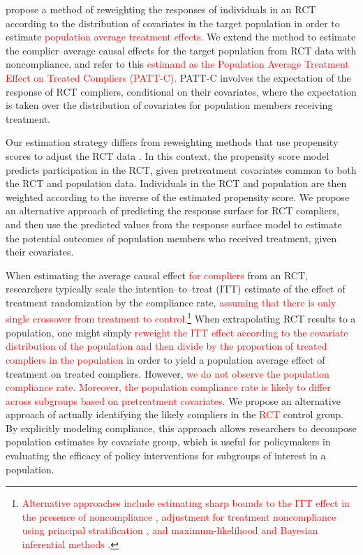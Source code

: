 \documentclass[hidelinks,12pt]{article}
\begin{document}
\citet{Hartman} propose a method of reweighting the responses of individuals in an RCT according to the distribution of covariates in the target population in order to estimate \textcolor{red}{population average treatment effects}. We extend the method to estimate the complier--average causal effects for the target population from RCT data with noncompliance, and refer to this \textcolor{red}{estimand as the Population Average Treatment Effect on Treated Compliers (PATT-C).} PATT-C involves the expectation of the response of RCT compliers, conditional on their covariates, where the expectation is taken over the distribution of covariates for population members receiving treatment. 

Our estimation strategy differs from reweighting methods that use propensity scores to adjust the RCT data \citep{stuart2011use}. In this context, the propensity score model predicts participation in the RCT, given pretreatment covariates common to both the RCT and population data. Individuals in the RCT and population are then weighted according to the inverse of the estimated propensity score. We propose an alternative approach of predicting the response surface for RCT compliers, and then use the predicted values from the response surface model to estimate the potential outcomes of population members who received treatment, given their covariates.

When estimating the average causal effect \textcolor{red}{for compliers} from an RCT, researchers typically scale the intention--to--treat (ITT) estimate of the effect of treatment randomization by the compliance rate, \textcolor{red}{assuming that there is only single crossover from treatment to control}.\footnote{\textcolor{red}{Alternative approaches include estimating sharp bounds to the ITT effect in the presence of noncompliance \citep{balke1997bounds,imai2013experimental}, adjustment for treatment noncompliance using principal stratification \citep{frangakis2002principal,frumento2012evaluating}, and maximum-likelihood and Bayesian inferential methods \citep{yau2001inference}.}} When extrapolating RCT results to a population, one might simply \textcolor{red}{reweight the ITT effect according to the covariate distribution of the population and then divide by the proportion of treated compliers in the population} in order to yield a population average effect of treatment on treated compliers. However, \textcolor{red}{we do not observe the population compliance rate. Moreover, the population compliance rate is likely to differ across subgroups based on pretreatment covariates.} We propose an alternative approach of actually identifying the likely compliers in the \textcolor{red}{RCT} control group. By explicitly modeling compliance, this approach allows researchers to decompose population estimates by covariate group, which is useful for policymakers in evaluating the efficacy of policy interventions for subgroups of interest in a population. 
\end{document}
